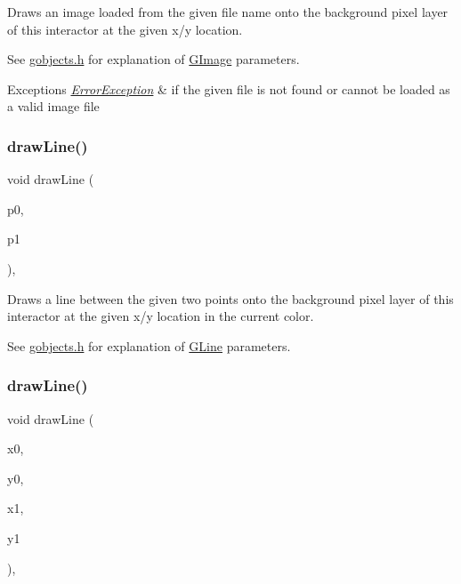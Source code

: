 Draws an image loaded from the given file name onto the background pixel layer of this interactor at the given x/y location. 

See \mbox{\hyperlink{gobjects_8h_source}{gobjects.\+h}} for explanation of \mbox{\hyperlink{classGImage}{G\+Image}} parameters. 
\begin{DoxyExceptions}{Exceptions}
{\em \mbox{\hyperlink{classErrorException}{Error\+Exception}}} & if the given file is not found or cannot be loaded as a valid image file \\
\hline
\end{DoxyExceptions}
\mbox{\label{classGDrawingSurface_ae6a24b6b9a6e795d3165c1c750d5bdf1}} 
\subsubsection{\texorpdfstring{draw\+Line()}{drawLine()}\hspace{0.1cm}{\footnotesize\ttfamily [1/2]}}
{\footnotesize\ttfamily void draw\+Line (\begin{DoxyParamCaption}\item[{const \mbox{\hyperlink{classGPoint}{G\+Point}} \&}]{p0,  }\item[{const \mbox{\hyperlink{classGPoint}{G\+Point}} \&}]{p1 }\end{DoxyParamCaption})\hspace{0.3cm}{\ttfamily [virtual]}, {\ttfamily [inherited]}}



Draws a line between the given two points onto the background pixel layer of this interactor at the given x/y location in the current color. 

See \mbox{\hyperlink{gobjects_8h_source}{gobjects.\+h}} for explanation of \mbox{\hyperlink{classGLine}{G\+Line}} parameters. \mbox{\label{classGDrawingSurface_aff299fe83178d2f3ce8c08c06b583484}} 
\subsubsection{\texorpdfstring{draw\+Line()}{drawLine()}\hspace{0.1cm}{\footnotesize\ttfamily [2/2]}}
{\footnotesize\ttfamily void draw\+Line (\begin{DoxyParamCaption}\item[{double}]{x0,  }\item[{double}]{y0,  }\item[{double}]{x1,  }\item[{double}]{y1 }\end{DoxyParamCaption})\hspace{0.3cm}{\ttfamily [virtual]}, {\ttfamily [inherited]}}



